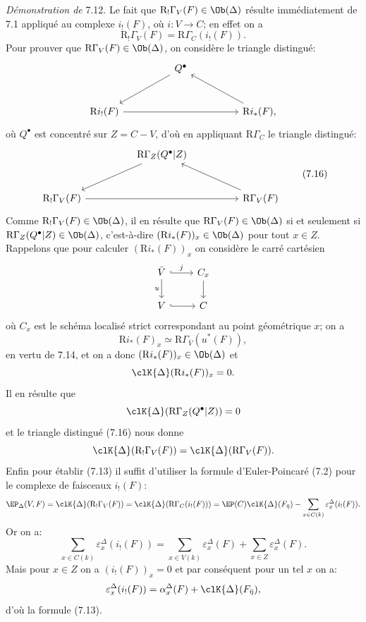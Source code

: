 \emph{Démonstration de} 7.12. Le fait que $\mathrm{R}_!\Gamma_V(F)\in\Ob(\Delta)$ résulte immédiatement de 7.1 appliqué au complexe $i_!(F)$, où $i:V\to C$; en effet on a
\[
\mathrm{R}_!\Gamma_V(F)=\mathrm{R}\Gamma_C(i_!(F)).
\]
Pour prouver que $\mathrm{R}\Gamma_V(F)\in\Ob(\Delta)$, on considère le triangle distingué:
\[
\begin{tikzcd}[column sep=huge,row sep=large]
& Q^\bullet \arrow[dl] &\\
\mathrm{R} i_!(F) \arrow[rr] && \mathrm{R} i_*(F) \arrow[ul],
\end{tikzcd}
\]
où $Q^\bullet$ est concentré sur $Z=C-V$, d'où en appliquant $\mathrm{R}\Gamma_C$ le triangle distingué:
\[
\begin{tikzcd}[column sep=huge,row sep=large]
& \mathrm{R}\Gamma_Z(Q^\bullet|Z) \arrow[dl] &\\
\mathrm{R}_!\Gamma_V(F) \arrow[rr] && \mathrm{R}\Gamma_V(F) \arrow[ul]
\end{tikzcd}
\tag{7.16}
\]
Comme $\mathrm{R}_!\Gamma_V(F)\in\Ob(\Delta)$, il en résulte que $\mathrm{R}\Gamma_V(F)\in\Ob(\Delta)$ si et seulement si $\mathrm{R}\Gamma_Z(Q^\bullet|Z)\in\Ob(\Delta)$, c'est-à-dire $(\mathrm{R} i_*(F))_x\in\Ob(\Delta)$ pour tout $x\in Z$. Rappelons que pour calculer $(\mathrm{R} i_*(F))_x$ on considère le carré cartésien
\[
\begin{tikzcd}
\bar V \arrow[r,hook,"j"] \arrow[d,"u"'] & C_x \arrow[d]\\
V \arrow[r,hook] & C
\end{tikzcd}
\]
où $C_x$ est le schéma localisé strict correspondant au point géométrique $x$; on a
\[
\mathrm{R} i_*(F)_x\simeq \mathrm{R}\Gamma_{\bar V}(u^*(F)),
\]
en vertu de 7.14, et on a 
donc $(\mathrm{R} i_*(F))_x\in\Ob(\Delta)$ et
\[
\clK{\Delta}(\mathrm{R} i_*(F))_x=0.
\]
Il en résulte que
\[
\clK{\Delta}(\mathrm{R}\Gamma_Z(Q^\bullet|Z))=0
\]
et le
triangle distingué (7.16) nous donne
\[
\clK{\Delta}(\mathrm{R}_!\Gamma_V(F))=\clK{\Delta}(\mathrm{R}\Gamma_V(F)).
\]
Enfin pour établir (7.13) il suffit d'utiliser la formule d'Euler-Poincaré (7.2) pour le complexe de faisceaux $i_!(F)$:
\[
\EP_\Delta(V,F)
=
\clK{\Delta}(\mathrm{R}_!\Gamma_V(F))
=
\clK{\Delta}(\mathrm{R}\Gamma_C(i_!(F)))
=
\EP(C)\clK{\Delta}(F_{\bar\eta})
-\sum_{x\in C(k)}\varepsilon_x^\Delta(i_!(F)).
\]
Or on a:
\[
\sum_{x\in C(k)}\varepsilon_x^\Delta(i_!(F))
=
\sum_{x\in V(k)}\varepsilon_x^\Delta(F)
+\sum_{x\in Z}\varepsilon_x^\Delta(F).
\]
Mais pour $x\in Z$ on a $(i_!(F))_x=0$ et par conséquent pour un tel $x$ on a:
\[
\varepsilon_x^\Delta(i_!(F))
=
\alpha_x^\Delta(F)+\clK{\Delta}(F_{\bar\eta}),
\]
d'où la formule (7.13).


